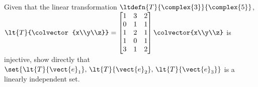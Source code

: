 Given that the linear transformation $\ltdefn{T}{\complex{3}}{\complex{5}}$, 
$\lt{T}{\colvector{x\\y\\z}} = 
\begin{bmatrix} 
1 & 3 & 2\\
0 & 1 & 1\\
1 & 2 & 1\\
1 & 0 & 1\\
3 & 1 & 2
\end{bmatrix} 
\colvector{x\\y\\z}$ 
is injective, show directly that 
$\set{
\lt{T}{\vect{e}_1},\,
\lt{T}{\vect{e}_2},\,
\lt{T}{\vect{e}_3}
}$ 
is a linearly independent set.
